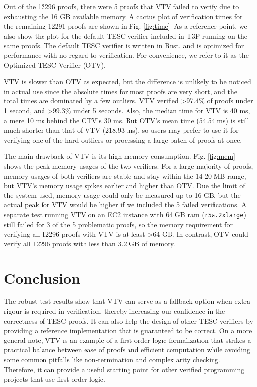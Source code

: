 \documentclass[12pt]{article}
\begin{document}
Out of the 12296 proofs, there were 5 proofs that VTV failed to verify 
due to exhausting the 16 GB available memory. A cactus plot of verification 
times for the remaining 12291 proofs are shown in Fig. \ref{fig:time}. 
As a reference point, we also show the plot for the default TESC verifier 
included in T3P running on the same proofs. The default TESC verifier 
is written in Rust, and is optimized for performance with no regard to 
verification. For convenience, we refer to it as the Optimized TESC Verifier (OTV).



VTV is slower than OTV as expected, but the difference is unlikely to be noticed 
in actual use since the absolute times for most proofs are very short, and the 
total times are dominated by a few outliers. 
VTV verified >97.4\% of proofs under 1 second, and >99.3\% under 5 seconds. 
Also, the median time for VTV is 40 ms, a mere 10 ms behind the OTV's 30 ms. 
But OTV's mean time (54.54 ms) is still much shorter than that of VTV (218.93 ms),
so users may prefer to use it for verifying one of the hard outliers or processing
a large batch of proofs at once.

The main drawback of VTV is its high memory consumption. Fig. \ref{fig:mem} shows
the peak memory usages of the two verifiers. For a large majority of proofs, 
memory usages of both verifiers are stable and stay within the 14-20 MB range,
but VTV's memory usage spikes earlier and higher than OTV. Due the limit of the system 
used, memory usage could only be measured up to 16 GB, but the actual peak for VTV 
would be higher if we included the 5 failed verifications. A separate test running 
VTV on an EC2 instance with 64 GB ram (\texttt{r5a.2xlarge}) still failed for 3 of 
the 5 problematic proofs, so the memory requirement for verifying all 12296 proofs 
with VTV is at least >64 GB. In contrast, OTV could verify all 
12296 proofs with less than 3.2 GB of memory.



\section{Conclusion}  \label{sec:conclusion}

The robust test results show that VTV can serve as a fallback option when extra rigour 
is required in verification, thereby increasing our confidence in the correctness of TESC proofs. 
It can also help the design of other TESC verifiers by providing a reference implementation 
that is guaranteed to be correct. On a more general note, VTV is an example of a first-order logic 
formalization that strikes a practical balance between ease of proofs and efficient computation 
while avoiding some common pitfalls like non-termination and complex arity checking. 
Therefore, it can provide a useful starting point for other verified programming projects 
that use first-order logic.
\end{document}

